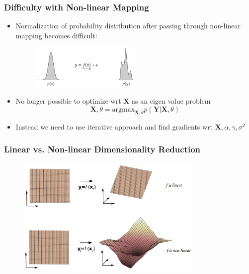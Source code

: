 \documentclass[10pt]{beamer}
\begin{document}
  \begin{frame}
  \frametitle{Difficulty with Non-linear Mapping}

  \begin{itemize}
    \item Normalization of probability distribution after passing through non-linear mapping becomes difficult:
      \begin{figure}
        \centering
        \includegraphics[width=0.5\textwidth]{nonlinear2.png}
      \end{figure}

    \item No longer possible to optimize wrt $\mathbf{X}$ as an eigen value problem
      \begin{equation}
        \mathbf{X},\theta = \text{argmax}_{\mathbf{X},\theta} p(\mathbf{Y}|\mathbf{X},\theta)
      \end{equation}

    \item Instead we need to use iterative approach and find gradients wrt $\mathbf{X},\alpha,\gamma,\sigma^2$

  \end{itemize}

  \end{frame}

  \begin{frame}
  \frametitle{Linear vs. Non-linear Dimensionality Reduction}

  \begin{figure}
    \centering
    \includegraphics[width=0.8\textwidth]{mapping.png}
  \end{figure}

  \end{frame}
\end{document}
